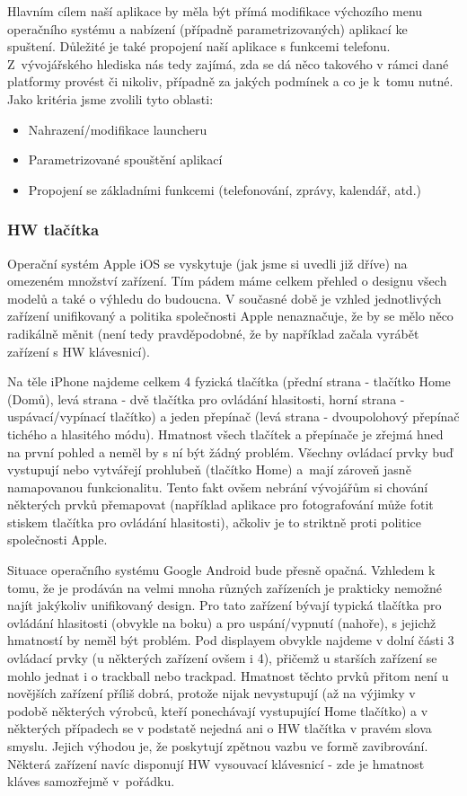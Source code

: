 \documentclass[thesis=M,czech]{FITthesis}[2012/06/26]
\begin{document}
Hlavním cílem naší aplikace by měla být přímá modifikace výchozího menu operačního systému a nabízení (případně parametrizovaných) aplikací ke spuštení. Důležité je také propojení naší aplikace s funkcemi telefonu. Z~vývojářského hlediska nás tedy zajímá, zda se dá něco takového v rámci dané platformy provést či nikoliv, případně za jakých podmínek a co je k~tomu nutné. Jako kritéria jsme zvolili tyto oblasti:

\begin{itemize}
\item    Nahrazení/modifikace launcheru
\item    Parametrizované spouštění aplikací
\item    Propojení se základními funkcemi (telefonování, zprávy, kalendář, atd.)
\end{itemize}

\subsubsection*{HW tlačítka}
Operační systém Apple iOS se vyskytuje (jak jsme si uvedli již dříve) na omezeném množství zařízení. Tím pádem máme celkem přehled o designu všech modelů a také o výhledu do budoucna. V současné době je vzhled jednotlivých zařízení unifikovaný a politika společnosti Apple nenaznačuje, že by se mělo něco radikálně měnit (není tedy pravděpodobné, že by například začala vyrábět zařízení s HW klávesnicí).

Na těle iPhone najdeme celkem 4 fyzická tlačítka (přední strana - tlačítko Home (Domů), levá strana - dvě tlačítka pro ovládání hlasitosti, horní strana - uspávací/vypínací tlačítko) a jeden přepínač (levá strana - dvoupolohový přepínač tichého a hlasitého módu)\cite{iphone}. Hmatnost všech tlačítek a přepínače je zřejmá hned na první pohled a neměl by s ní být žádný problém. Všechny ovládací prvky buď vystupují nebo vytvářejí prohlubeň (tlačítko Home) a~mají zároveň jasně namapovanou funkcionalitu\cite{iphone_anatomy}. Tento fakt ovšem nebrání vývojářům si chování některých prvků přemapovat (například aplikace pro fotografování může fotit stiskem tlačítka pro ovládání hlasitosti), ačkoliv je to striktně proti politice společnosti Apple.

Situace operačního systému Google Android bude přesně opačná. Vzhledem k tomu, že je prodáván na velmi mnoha různých zařízeních je prakticky nemožné najít jakýkoliv unifikovaný design. Pro tato zařízení bývají typická tlačítka pro ovládání hlasitosti (obvykle na boku) a pro uspání/vypnutí (nahoře), s jejichž hmatností by neměl být problém. Pod displayem obvykle najdeme v dolní části 3 ovládací prvky (u některých zařízení ovšem i 4), přičemž u starších zařízení se mohlo jednat i o trackball nebo trackpad. Hmatnost těchto prvků přitom není u novějších zařízení příliš dobrá, protože nijak nevystupují (až na výjimky v podobě některých výrobců, kteří ponechávají vystupující Home tlačítko) a v některých případech se v podstatě nejedná ani o HW tlačítka v pravém slova smyslu. Jejich výhodou je, že poskytují zpětnou vazbu ve formě zavibrování. Některá zařízení navíc disponují HW vysouvací klávesnicí - zde je hmatnost kláves samozřejmě v~pořádku.
\end{document}
